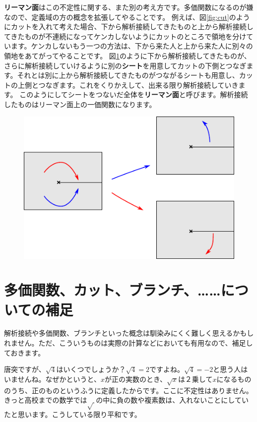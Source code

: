 \documentclass[report,paper=a4, fontsize=12pt, line_length=16cm, number_of_lines=33,dvipdfmx]{jlreq}
\numberwithin{equation}{section}
\newcommand{\strong}[1]{\textsf{\bfseries #1}}
\begin{document}
\strong{リーマン面}はこの不定性に関する、また別の考え方です。多価関数になるのが嫌なので、定義域の方の概念を拡張してやることです。
例えば、図\ref{fig:cut}のようにカットを入れて考えた場合、下から解析接続してきたものと上から解析接続してきたものが不連続になってケンカしないようにカットのところで領地を分けています。ケンカしないもう一つの方法は、下から来た人と上から来た人に別々の領地をあてがってやることです。
図\ref{fig:riemannsurface}のように下から解析接続してきたものが、さらに解析接続していけるように別の\strong{シート}を用意してカットの下側とつなぎます。それとは別に上から解析接続してきたものがつながるシートも用意し、カットの上側とつなぎます。これをくりかえして、出来る限り解析接続していきます。
このようにしてシートをつないだ全体を\strong{リーマン面}と呼びます。解析接続したものはリーマン面上の一価関数になります。
\begin{figure}[htbp]
  \centering
  \includegraphics{riemannsurface.pdf}
  \caption{}
  \label{fig:riemannsurface}
\end{figure}

\section{多価関数、カット、ブランチ、……についての補足}
解析接続や多価関数、ブランチといった概念は馴染みにくく難しく思えるかもしれません。ただ、こういうものは実際の計算などにおいても有用なので、補足しておきます。

唐突ですが、$\sqrt{4}$はいくつでしょうか？$\sqrt{4}=2$ですよね。$\sqrt{4}=-2$と思う人はいませんね。なぜかというと、$x$が正の実数のとき、$\sqrt{x}$は２乗して$x$になるもののうち、正のものというふうに定義したからです。ここに不定性はありません。きっと高校までの数学では$\sqrt{\ }$の中に負の数や複素数は、入れないことにしていたと思います。こうしている限り平和です。
\end{document}
